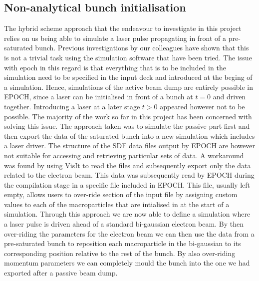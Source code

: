 \subsection{Non-analytical bunch initialisation}
The hybrid scheme approach that the endeavour to investigate in this project relies on us being able to simulate a laser pulse propagating in front of a pre-saturated bunch. Previous investigations by our colleagues have shown that this is not a trivial task using the simulation software that have been tried. The issue with epoch in this regard is that everything that is to be included in the simulation need to be specified in the input deck and introduced at the beging of a simulation. Hence, simulations of the active beam dump are entirely possible in EPOCH, since a laser can be initialised in front of a bunch at $t=0$ and driven together. Introducing a laser at a later stage $t>0$ appeared however not to be possible. The majority of the work so far in this project has been concerned with solving this issue. The approach taken was to simulate the passive part first and then export the data of the saturated bunch into a new simulation which includes a laser driver. The structure of the SDF data files output by EPOCH are however not suitable for accessing and retrieving particular sets of data. A workaround was found by using VisIt to read the files and subsequently export only the data related to the electron beam. This data was subsequently read by EPOCH during the compilation stage in a specific file included in EPOCH. This file, usually left empty, allows users to over-ride section of the input file by assigning custom values to each of the macroparticles that are intialised in at the start of a simulation. Through this approach we are now able to define a simulation where a laser pulse is driven ahead of a standard bi-gaussian electron beam. By then over-riding the parameters for the electron beam we can then use the data from a pre-saturated bunch to reposition each macroparticle in the bi-gaussian to its corresponding position relative to the rest of the bunch. By also over-riding momentum parameters we can completely mould the bunch into the one we had exported after a passive beam dump. 



